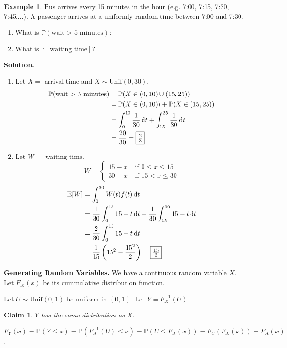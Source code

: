 \documentclass[a4paper,11pt]{amsbook}
\makeatletter
\renewenvironment{proof}[1][\proofname]{\par
    \pushQED{\qed}%
    \normalfont \topsep6\p@\@plus6\p@\relax
    \trivlist
    \itemindent\z@ %
    \item[\hskip\labelsep
          \scshape
      #1\@addpunct{.}]\ignorespaces
}{%
    \popQED\endtrivlist\@endpefalse
}
\newtheorem{claim}{\hspace{-2em} \color{darkblue} Claim}[chapter]
\theoremstyle{definition}
\newtheorem{example}{\hspace{-2em} \color{darkblue} Example}[chapter]
\theoremstyle{remark}
\newcommand{\E}{\mathbb{E}}
\renewcommand{\P}{\mathbb{P}}
\newcommand\0{\varnothing}
\newcommand\dt[1][t]{\,\mathrm{d}#1}
\newcommand\Unif{\text{Unif}}
\makeatother
\begin{document}
    \begin{example}
        Bus arrives every 15 minutes in the hour (e.g. 7:00, 7:15, 7:30, 7:45,...).
        A passenger arrives at a uniformly random time between 7:00 and 7:30.
        \begin{enumerate}
            \item What is $\P(\text{wait > 5 minutes})$:
            \item What is $\E[\text{waiting time}]$?
        \end{enumerate}
        \textbf{Solution.} 
        \begin{enumerate}
            \item Let $X=$ arrival time and $X\sim\Unif(0,30)$.
            \begin{align*}
                \P(\text{wait > 5 minutes})&=\P(X\in(0,10)\cup(15,25)) \\
                &=\P(X\in(0,10))+\P(X\in(15,25)) \\
                &=\int_{0}^{10}\frac{1}{30}\dt+\int_{15}^{25}\frac{1}{30}\dt \\
                &=\frac{20}{30}=\fbox{$\frac{2}{3}$}
            \end{align*}
            \item Let $W=$ waiting time.
            $$W=\begin{cases}
                15-x & \text{ if }0\leq x\leq 15 \\
                30-x & \text{ if }15<x\leq30
            \end{cases}$$
            \begin{align*}
                \E[W]&=\int_{0}^{30}W(t)f(t)\dt \\
                &=\frac1{30}\int_{0}^{15}15-t\dt+\frac1{30}\int_{15}^{30}15-t\dt \\
                &=\frac2{30}\int_{0}^{15}15-t\dt \\
                &=\frac1{15}\left(15^2-\frac{15^2}2\right)=\fbox{$\frac{15}2$}
            \end{align*}
        \end{enumerate}
    \end{example}

    \textbf{Generating Random Variables.} We have a continuous random variable $X$.
    Let $F_X(x)$ be its cummulative distribution function.

    Let $U\sim\Unif(0,1)$ be uniform in $(0,1)$.
    Let $Y=F_X^{-1}(U)$.

    \begin{claim}
        $Y$ has the same distribution as $X$.
    \end{claim}
    \begin{proof}
        $F_Y(x)=\P(Y\leq x)=\P(F_X^{-1}(U)\leq x)=\P(U\leq F_X(x))=F_U(F_X(x))=F_X(x)$.
    \end{proof}
\end{document}
